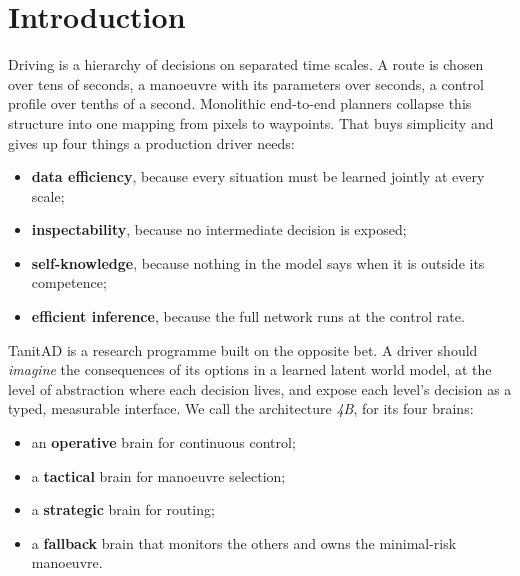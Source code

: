 \documentclass[10pt,twocolumn]{article}
\theoremstyle{remark}
\begin{document}
\section{Introduction}
Driving is a hierarchy of decisions on separated time scales. A route is chosen over tens of seconds, a manoeuvre with its
parameters over seconds, a control profile over tenths of a second. Monolithic end-to-end planners collapse this structure into one
mapping from pixels to waypoints. That buys simplicity and gives up four things a production driver needs:
\begin{itemize}
  \item \textbf{data efficiency}, because every situation must be learned jointly at every scale;
  \item \textbf{inspectability}, because no intermediate decision is exposed;
  \item \textbf{self-knowledge}, because nothing in the model says when it is outside its competence;
  \item \textbf{efficient inference}, because the full network runs at the control rate.
\end{itemize}

TanitAD is a research programme built on the opposite bet. A driver should \emph{imagine} the consequences of its options in a
learned latent world model, at the level of abstraction where each decision lives, and expose each level's decision as a typed,
measurable interface. We call the architecture \emph{4B}, for its four brains:
\begin{itemize}
  \item an \textbf{operative} brain for continuous control;
  \item a \textbf{tactical} brain for manoeuvre selection;
  \item a \textbf{strategic} brain for routing;
  \item a \textbf{fallback} brain that monitors the others and owns the minimal-risk manoeuvre.
\end{itemize}
\end{document}
